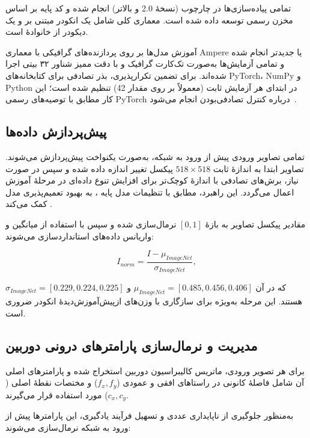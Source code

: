 تمامی پیاده‌سازی‌ها در چارچوب  (نسخهٔ 2.0 و بالاتر) انجام شده و کد پایه بر اساس مخزن رسمی  توسعه داده شده است. معماری کلی شامل یک انکودر مبتنی بر  و یک دیکودر از خانوادهٔ  است.

آموزش مدل‌ها بر روی پردازنده‌های گرافیکی  با معماری Ampere یا جدیدتر انجام شده و تمامی آزمایش‌ها به‌صورت تک‌کارت گرافیک و با دقت ممیز شناور ۳۲ بیتی اجرا شده‌اند. برای تضمین تکرارپذیری، بذر تصادفی برای کتابخانه‌های PyTorch، NumPy و Python در ابتدای هر آزمایش ثابت (معمولاً بر روی مقدار 42) تنظیم شده است؛ این کار مطابق با توصیه‌های رسمی PyTorch درباره کنترل تصادفی‌بودن انجام می‌شود~\cite{PyTorchReproducibility}.

\subsection{پیش‌پردازش داده‌ها}

تمامی تصاویر ورودی پیش از ورود به شبکه، به‌صورت یکنواخت پیش‌پردازش می‌شوند. تصاویر ابتدا به اندازهٔ ثابت $518 \times 518$ پیکسل تغییر اندازه داده شده و سپس در صورت نیاز، برش‌های تصادفی با اندازهٔ کوچک‌تر برای افزایش تنوع داده‌ای در مرحلهٔ آموزش اعمال می‌گردد. این راهبرد، مطابق با تنظیمات مدل پایه ، به بهبود تعمیم‌پذیری مدل کمک می‌کند \cite{DepthAnythingV2}.

مقادیر پیکسل تصاویر به بازهٔ $[0,1]$ نرمال‌سازی شده و سپس با استفاده از میانگین و واریانس داده‌های  استانداردسازی می‌شوند:

\begin{equation}
I_{norm} = \frac{I - \mu_{ImageNet}}{\sigma_{ImageNet}},
\end{equation}

که در آن $\mu_{ImageNet} = [0.485, 0.456, 0.406]$ و $\sigma_{ImageNet} = [0.229, 0.224, 0.225]$ هستند. این مرحله به‌ویژه برای سازگاری با وزن‌های ازپیش‌آموزش‌دیدهٔ انکودر  ضروری است.

\subsection{مدیریت و نرمال‌سازی پارامترهای درونی دوربین}

برای هر تصویر ورودی، ماتریس کالیبراسیون دوربین استخراج شده و پارامترهای اصلی آن شامل فاصلهٔ کانونی در راستاهای افقی و عمودی ($f_x, f_y$) و مختصات نقطهٔ اصلی ($c_x, c_y$) مورد استفاده قرار می‌گیرند.

به‌منظور جلوگیری از ناپایداری عددی و تسهیل فرآیند یادگیری، این پارامترها پیش از ورود به شبکه نرمال‌سازی می‌شوند:


